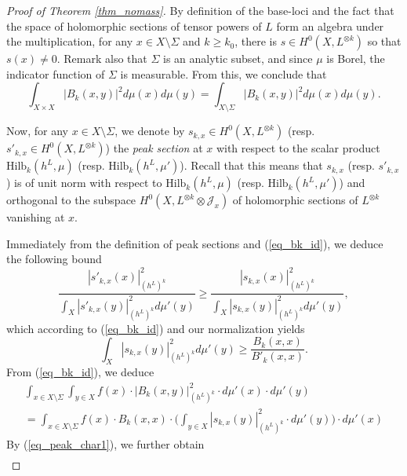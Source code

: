 \documentclass[12pt]{article}
\numberwithin{equation}{section}
\theoremstyle{theorem}
\theoremstyle{definition}
\theoremstyle{remark}
\begin{document}
\begin{proof}[Proof of Theorem \ref{thm_nomass}]
		By definition of the base-loci and the fact that the space of holomorphic sections of tensor powers of $L$ form an algebra under the multiplication, for any $x \in X \setminus \Sigma$ and $k \geq k_0$, there is $s \in H^0(X, L^{\otimes k})$ so that $s(x) \neq 0$.
		Remark also that $\Sigma$ is an analytic subset, and since $\mu$ is Borel, the indicator function of $\Sigma$ is measurable.
		From this, we conclude that
		\begin{equation}\label{eq_int_sigm_disap}
			\int_{X \times X} |B_k(x, y)|^2 d \mu(x) d \mu(y) = \int_{X \setminus \Sigma}  |B_k(x, y)|^2 d \mu(x) d \mu(y).
		\end{equation}
		\par 
		Now, for any $x \in X \setminus \Sigma$, we denote by $s_{k, x} \in H^0(X, L^{\otimes k})$ (resp. $s'_{k, x} \in H^0(X, L^{\otimes k})$) the \textit{peak section} at $x$ with respect to the scalar product ${\textrm{Hilb}}_k(h^L, \mu)$ (resp. ${\textrm{Hilb}}_k(h^L, \mu')$).
		Recall that this means that $s_{k, x}$ (resp. $s'_{k, x}$) is of unit norm with respect to ${\textrm{Hilb}}_k(h^L, \mu)$ (resp. ${\textrm{Hilb}}_k(h^L, \mu')$) and orthogonal to the subspace $H^0(X, L^{\otimes k} \otimes \mathcal{J}_x)$ of holomorphic sections of $L^{\otimes k}$ vanishing at $x$.
		\par 
		Immediately from the definition of peak sections and (\ref{eq_bk_id}), we deduce the following bound
		\begin{equation}\label{eq_peak_char}
			\frac{|s'_{k, x}(x)|^2_{(h^L)^k}}{\int_X |s'_{k, x}(y)|^2_{(h^L)^k} d \mu'(y)}
			\geq
			\frac{|s_{k, x}(x)|^2_{(h^L)^k}}{\int_X |s_{k, x}(y)|^2_{(h^L)^k} d \mu'(y)},
		\end{equation}
		which according to (\ref{eq_bk_id}) and our normalization yields
		\begin{equation}\label{eq_peak_char1}
			\int_X |s_{k, x}(y)|^2_{(h^L)^k} d \mu'(y)
			\geq
			\frac{B_k(x, x)}{B'_k(x, x)}.
		\end{equation}
		From (\ref{eq_bk_id}), we deduce
		\begin{multline}\label{eq_int_bk_peak}
			\int_{x \in X \setminus \Sigma} \int_{y \in X} f(x) \cdot |B_k(x, y)|^{2}_{(h^L)^k} \cdot d \mu'(x) \cdot d \mu'(y)
			\\
			=
			\int_{x \in X \setminus \Sigma} f(x) \cdot B_k(x, x) \cdot \Big( \int_{y \in X} |s_{k, x}(y)|^2_{(h^L)^k} \cdot d \mu'(y) \Big) \cdot d \mu'(x)
		\end{multline}
		By (\ref{eq_peak_char1}), we further obtain 
		\begin{multline}\label{eq_int_bk_peak2}

\end{multline}
\end{proof}
\end{document}
